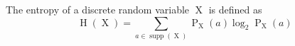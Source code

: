 The entropy of a discrete random variable $\operatorname{X}$ is defined as
$$\operatorname{H}(\operatorname{X}) = \sum\limits_{a \in \operatorname{supp}(\operatorname{X})} \operatorname{P}_{\operatorname{X}}(a) \log_2 \operatorname{P}_{\operatorname{X}}(a)$$
